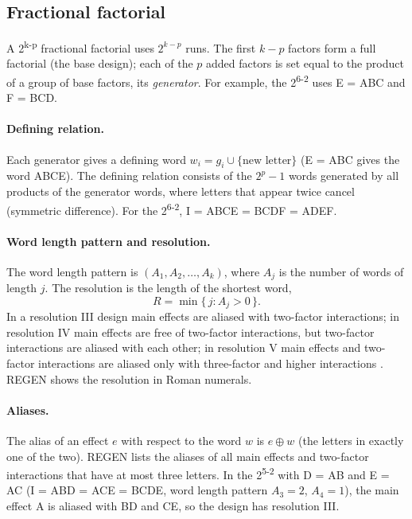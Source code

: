 \subsection{Fractional factorial}
\label{sec:ch03-fraction}
A 2\textsuperscript{k-p} fractional factorial uses $2^{k-p}$ runs. The first $k-p$ factors form a full factorial
(the base design); each of the $p$ added factors is set equal to the product of a group of base factors, its
\emph{generator}. For example, the 2\textsuperscript{6-2} uses E = ABC and F = BCD.

\paragraph{Defining relation.} Each generator gives a defining word $w_i = g_i \cup \{\text{new letter}\}$ (E = ABC
gives the word ABCE). The defining relation consists of the $2^p - 1$ words generated by all products of the
generator words, where letters that appear twice cancel (symmetric difference). For the 2\textsuperscript{6-2},
I = ABCE = BCDF = ADEF.

\paragraph{Word length pattern and resolution.} The word length pattern is $(A_1, A_2, \dots, A_k)$, where $A_j$
is the number of words of length $j$. The resolution is the length of the shortest word,
\begin{equation}
R = \min\{\, j : A_j > 0 \,\}.
\label{eq:ch03-resolution}
\end{equation}
In a resolution III design main effects are aliased with two-factor interactions; in resolution IV main effects are
free of two-factor interactions, but two-factor interactions are aliased with each other; in resolution V main
effects and two-factor interactions are aliased only with three-factor and higher interactions
\citep{montgomery2017}. REGEN shows the resolution in Roman numerals.

\paragraph{Aliases.} The alias of an effect $e$ with respect to the word $w$ is $e \oplus w$ (the letters in exactly
one of the two). REGEN lists the aliases of all main effects and two-factor interactions that have at most three
letters. In the 2\textsuperscript{5-2} with D = AB and E = AC (I = ABD = ACE = BCDE, word length pattern $A_3 = 2$,
$A_4 = 1$), the main effect A is aliased with BD and CE, so the design has resolution III.

